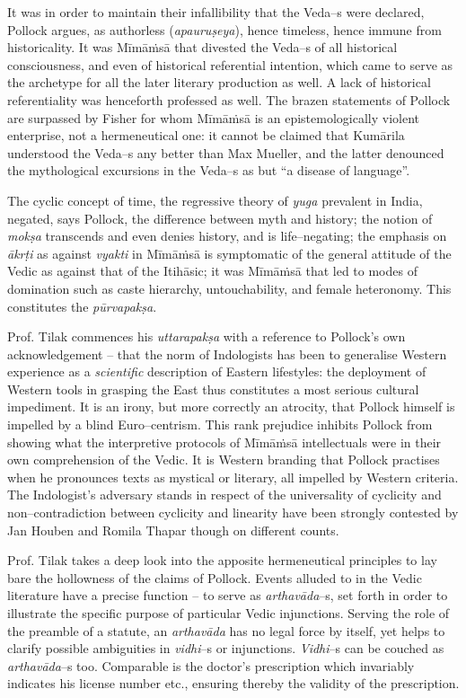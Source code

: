 It was in order to maintain their infallibility that the Veda–s were declared, Pollock argues, as authorless (\textit{apauruṣeya}), hence timeless, hence immune from historicality. It was Mīmāṁsā that divested the Veda–s of all historical consciousness, and even of historical referential intention, which came to serve as the archetype for all the later literary production as well. A lack of historical referentiality was henceforth professed as well. The brazen statements of Pollock are surpassed by Fisher for whom Mīmāṁsā is an epistemologically violent enterprise, not a hermeneutical one: it cannot be claimed that Kumārila understood the Veda–s any better than Max Mueller, and the latter denounced the mythological excursions in the Veda–s as but “a disease of language”. 

The cyclic concept of time, the regressive theory of \textit{yuga} prevalent in India, negated, says Pollock, the difference between myth and history; the notion of \textit{mokṣa} transcends and even denies history, and is life–negating; the emphasis on \textit{ākrṭi} as against \textit{vyakti} in Mīmāṁsā is symptomatic of the general attitude of the Vedic as against that of the Itihāsic; it was Mīmāṁsā that led to modes of domination such as caste hierarchy, untouchability, and female heteronomy. This constitutes the \textit{pūrvapakṣa}.

 Prof. Tilak commences his \textit{uttarapakṣa} with a reference to Pollock’s own acknowledgement – that the norm of Indologists has been to generalise Western experience as a \textit{scientific} description of Eastern lifestyles: the deployment of Western tools in grasping the East thus constitutes a most serious cultural impediment. It is an irony, but more correctly an atrocity, that Pollock himself is impelled by a blind Euro–centrism. This rank prejudice inhibits Pollock from showing what the interpretive protocols of Mīmāṁsā intellectuals were in their own comprehension of the Vedic. It is Western branding that Pollock practises when he pronounces texts as mystical or literary, all impelled by Western criteria. The Indologist’s adversary stands in respect of the universality of cyclicity and non–contradiction between cyclicity and linearity have been strongly contested by Jan Houben and Romila Thapar though on different counts. 

Prof. Tilak takes a deep look into the apposite hermeneutical principles to lay bare the hollowness of the claims of Pollock. Events alluded to in the Vedic literature have a precise function – to serve as \textit{arthavāda}–s, set forth in order to illustrate the specific purpose of particular Vedic injunctions. Serving the role of the preamble of a statute, an \textit{arthavāda} has no legal force by itself, yet helps to clarify possible ambiguities in \textit{vidhi}–s or injunctions. \textit{Vidhi}–s can be couched as \textit{arthavāda}–s too. Comparable is the doctor’s prescription which invariably indicates his license number etc., ensuring thereby the validity of the prescription. 

